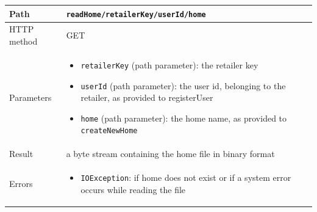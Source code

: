 \documentclass[a4paper]{report}
\begin{document}
\begin{center}
\begin{tabularx} {\textwidth} { | l | X | }

\hline

Path & \texttt{readHome/retailerKey/userId/home} \\

\hline

HTTP method & GET \\

\hline

Parameters & \begin{itemize}[leftmargin=*,noitemsep,topsep=0px]
\item \texttt{retailerKey} (path parameter): the retailer key
\item \texttt{userId} (path parameter): the user id, belonging to the retailer, as provided to registerUser 
\item \texttt{home} (path parameter): the home name, as provided to \texttt{createNewHome}
\end{itemize} \\

\hline

Result & a byte stream containing the home file in binary format \\

\hline

Errors & \begin{itemize}[leftmargin=*,noitemsep,topsep=0px]
\item \texttt{IOException}: if home does not exist or if a system error occurs while reading the file
\end{itemize} \\

\hline

\end{tabularx}
\end{center}
       
\end{document}
